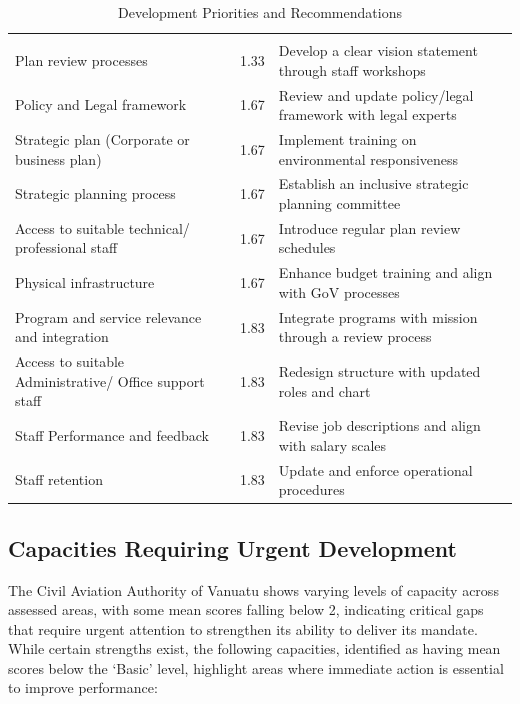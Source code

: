 \documentclass[
  10pt,
]{report}
\begin{document}
\begin{longtable}[t]{lr>{\raggedright\arraybackslash}p{7cm}}

\caption{\label{tbl-top-10-priorities}Development Priorities and
Recommendations}

\tabularnewline

\\
\toprule
\cellcolor[HTML]{006498}{\textcolor{white}{\textbf{Capacity Category}}} & \cellcolor[HTML]{006498}{\textcolor{white}{\textbf{Mean Score}}} & \cellcolor[HTML]{006498}{\textcolor{white}{\textbf{Recommended Action}}}\\
\midrule
Plan review processes & 1.33 & Develop a clear vision statement through staff workshops\\
Policy and Legal framework & 1.67 & Review and update policy/legal framework with legal experts\\
Strategic plan (Corporate or business plan) & 1.67 & Implement training on environmental responsiveness\\
Strategic planning process & 1.67 & Establish an inclusive strategic planning committee\\
Access to suitable technical/ professional staff & 1.67 & Introduce regular plan review schedules\\
\addlinespace
Physical infrastructure & 1.67 & Enhance budget training and align with GoV processes\\
Program and service relevance and integration & 1.83 & Integrate programs with mission through a review process\\
Access to suitable Administrative/ Office support staff & 1.83 & Redesign structure with updated roles and chart\\
Staff Performance and feedback & 1.83 & Revise job descriptions and align with salary scales\\
Staff retention & 1.83 & Update and enforce operational procedures\\
\bottomrule

\end{longtable}

\endgroup{}

\subsection{Capacities Requiring Urgent
Development}\label{capacities-requiring-urgent-development}

The Civil Aviation Authority of Vanuatu shows varying levels of capacity
across assessed areas, with some mean scores falling below 2, indicating
critical gaps that require urgent attention to strengthen its ability to
deliver its mandate. While certain strengths exist, the following
capacities, identified as having mean scores below the `Basic' level,
highlight areas where immediate action is essential to improve
performance:
\end{document}
